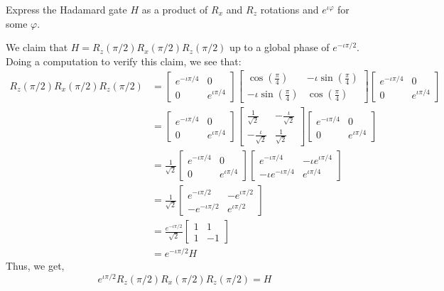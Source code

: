 \begin{example}
    Express the Hadamard gate $H$ as a product of $R_x$ and $R_z$ rotations and $e^{\iota \varphi}$ for some $\varphi$.

    We claim that $H=R_z(\pi/2)R_x(\pi/2)R_z(\pi/2)$ up to a global phase of $e^{-\iota \pi/2}$. Doing a computation to verify this claim, we see that:
    \begin{align*}
    R_z(\pi/2)R_x(\pi/2)R_z(\pi/2)&=\begin{bmatrix} e^{-\iota \pi/4} & 0 \\ 0 & e^{\iota \pi/4} \end{bmatrix} \begin{bmatrix} \cos(\frac{\pi}{4}) & -\iota \sin(\frac{\pi}{4}) \\ - \iota \sin (\frac{\pi}{4}) & \cos(\frac{\pi}{4}) \end{bmatrix}\begin{bmatrix} e^{-\iota \pi/4} & 0 \\ 0 &e^{\iota \pi/4} \end{bmatrix}\\
    &=\begin{bmatrix} e^{-\iota \pi/4} & 0 \\ 0 & e^{\iota \pi/4} \end{bmatrix} \begin{bmatrix}\frac{1}{\sqrt{2}} & -\frac{\iota}{\sqrt{2}} \\ -\frac{\iota}{\sqrt{2}} & \frac{1}{\sqrt{2}} \end{bmatrix}\begin{bmatrix} e^{-\iota \pi/4} & 0 \\ 0 &e^{\iota \pi/4} \end{bmatrix}\\
    &=\frac{1}{\sqrt{2}} \begin{bmatrix} e^{-\iota \pi/4} & 0 \\ 0 & e^{\iota \pi/4} \end{bmatrix}\begin{bmatrix} e^{-\iota \pi/4} & -\iota e^{\iota\pi/4} \\ -\iota e^{-\iota \pi/4} & e^{\iota \pi/4} \end{bmatrix}\\
    &=\frac{1}{\sqrt{2}}\begin{bmatrix} e^{-\iota \pi/2} & -e^{\iota \pi/2} \\ - e^{-\iota \pi/2} & e^{\iota \pi/2} \end{bmatrix}\\
    &=\frac{e^{-\iota \pi/2}}{\sqrt{2}}\begin{bmatrix} 1 & 1 \\ 1 & -1 \end{bmatrix}\\
    &=e^{-\iota \pi/2} H
    \end{align*}
    Thus, we get,
    \[
    e^{\iota \pi/2} R_z(\pi/2)R_x(\pi/2)R_z(\pi/2) =H
    \]
\end{example}

